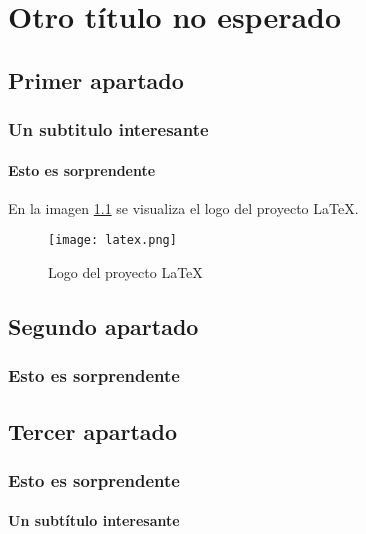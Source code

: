 
\chapter{Otro título no esperado}
   \lipsum[1-3]
\section{Primer apartado}
   \lipsum[4-5]
\subsection{Un subtitulo interesante}
   \lipsum[6]
\subsubsection{Esto es sorprendente}
   \lipsum[2-3]
   En la imagen \ref{fig:proyecto_tres} se visualiza el logo del proyecto \LaTeX.

\begin{figure}[ht]
   \centering
   \texttt{[image: latex.png]}
   \caption{Logo del proyecto \LaTeX}
   \label{fig:proyecto_tres}
\end{figure}
\section{Segundo apartado}
   \lipsum[1]
   \subsection{Esto es sorprendente}
   \lipsum[2]
\section{Tercer apartado}
\subsection{Esto es sorprendente}
\lipsum[3-4]
\subsubsection{Un subtítulo interesante}
\lipsum[5-7]
